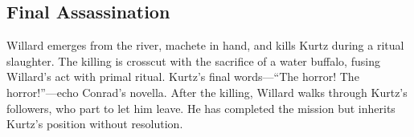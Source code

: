 \subsection*{Final Assassination}
\label{scene:assassination}

Willard emerges from the river, machete in hand, and kills Kurtz during a ritual slaughter.
The killing is crosscut with the sacrifice of a water buffalo, fusing Willard's act with
primal ritual. Kurtz's final words---``The horror! The horror!''---echo Conrad's novella.
After the killing, Willard walks through Kurtz's followers, who part to let him leave. He has
completed the mission but inherits Kurtz's position without resolution.

